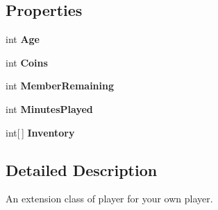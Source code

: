 \subsection*{\-Properties}
\begin{DoxyCompactItemize}
\item 
\hypertarget{classSharpenguin_1_1Data_1_1MyPlayer_ae78b8a9ecf05afedb7baed1336e82dee}{int {\bfseries \-Age}}\label{classSharpenguin_1_1Data_1_1MyPlayer_ae78b8a9ecf05afedb7baed1336e82dee}

\item 
\hypertarget{classSharpenguin_1_1Data_1_1MyPlayer_a3f6ac8fc09a165c81a23d25ff016b7e2}{int {\bfseries \-Coins}}\label{classSharpenguin_1_1Data_1_1MyPlayer_a3f6ac8fc09a165c81a23d25ff016b7e2}

\item 
\hypertarget{classSharpenguin_1_1Data_1_1MyPlayer_acffca37897a5d514aba1eb8156b67813}{int {\bfseries \-Member\-Remaining}}\label{classSharpenguin_1_1Data_1_1MyPlayer_acffca37897a5d514aba1eb8156b67813}

\item 
\hypertarget{classSharpenguin_1_1Data_1_1MyPlayer_aa706275c546c3c0d4dddb6e2258ab3a4}{int {\bfseries \-Minutes\-Played}}\label{classSharpenguin_1_1Data_1_1MyPlayer_aa706275c546c3c0d4dddb6e2258ab3a4}

\item 
\hypertarget{classSharpenguin_1_1Data_1_1MyPlayer_ae25dc7ef58b29f12bceb53e1706141fe}{int\mbox{[}$\,$\mbox{]} {\bfseries \-Inventory}}\label{classSharpenguin_1_1Data_1_1MyPlayer_ae25dc7ef58b29f12bceb53e1706141fe}

\end{DoxyCompactItemize}


\subsection{\-Detailed \-Description}
\-An extension class of player for your own player. 

